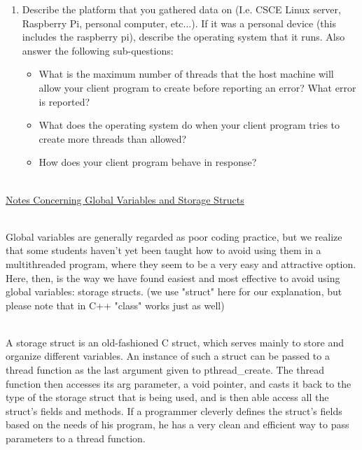 \documentclass[12pt]{extarticle}
\begin{document}
\begin{itemize}
\begin{itemize}
\begin{enumerate}
\begin{itemize}
            \end{itemize}
            
            \item Describe the platform that you gathered data on (I.e. CSCE Linux server, Raspberry Pi, personal computer, etc...).  If it was a personal device (this includes the raspberry pi), describe the operating system that it runs.  Also answer the following sub-questions:
            \begin{itemize}
                \setlength\itemsep{-0.1em}
                
                \item What is the maximum number of threads that the host machine will allow your client program to create before reporting an error? What error is reported?
                \item What does the operating system do when your client program tries to create more threads than allowed?
                \item How does your client program behave in response?
                
            \end{itemize}
            
        \end{enumerate}
        
    \end{itemize}
    
\end{itemize}

\noindent
\ \\
{\large \underline{Notes Concerning Global Variables and Storage Structs}}

	\ \\
	Global variables are generally regarded as poor coding practice, but we realize that some students haven't yet been taught how to avoid using them in a multithreaded program, where they seem to be a very easy and attractive option. Here, then, is the way we have found easiest and most effective to avoid using global variables: storage structs. (we use "struct" here for our explanation, but please note that in C++ "class" works just as well)
	
	\ \\
	A storage struct is an old-fashioned C struct, which serves mainly to store and organize different variables. An instance of such a struct can be  passed to a thread function as the last argument given to pthread\_create. The thread function then accesses its arg parameter, a void pointer, and casts it back to the type of the storage struct that is being used, and is then able access all the struct's fields and methods. If a programmer cleverly defines the struct's fields based on the needs of his program, he has a very clean and efficient way to pass parameters to a thread function.
	
\end{document}
